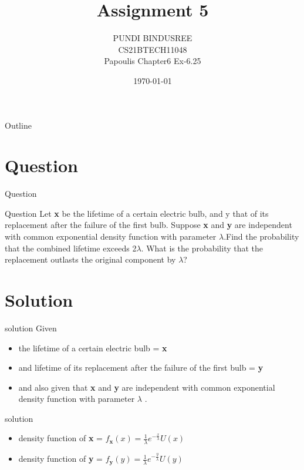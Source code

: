 \documentclass{beamer}
\title{Assignment 5}
\author{PUNDI BINDUSREE \\
     CS21BTECH11048 \\
     Papoulis Chapter6 Ex-6.25\\ }
\date{\today}
\begin{document}
     
\begin{frame}
    \maketitle    
\end{frame}
     
     \logo{}
     
     \begin{frame}{Outline}
    \tableofcontents
     \end{frame}


\section{Question}
\begin{frame}{Question}
\begin{block}{Question}
Let \textbf{x} be the lifetime of a certain electric bulb, and y that of its replacement after the failure of the first bulb. Suppose \textbf{x} and \textbf{y} are independent with common exponential density function with parameter $\lambda$.Find the probability that the combined lifetime exceeds 2$\lambda$. What is the probability that the replacement outlasts the original component by $\lambda$?
\end{block}
\end{frame}


\section{Solution}
\begin{frame}{solution}
Given\\
\begin{itemize}
    \item the lifetime of a certain electric bulb = \textbf{x}
    \item and lifetime of its replacement after the failure of the first bulb = \textbf{y}
    \item and also given that \textbf{x} and \textbf{y} are independent with common exponential density function with parameter $\lambda$ .
\end{itemize}
\end{frame}


\begin{frame}{solution}
\begin{itemize}
    \item density function of \textbf{x} = $f_{\textbf{x}}(x) = \frac{1}{\lambda}e^{-\frac{x}{\lambda}}U(x)$
    \item density function of \textbf{y} = $f_{\textbf{y}}(y) = \frac{1}{\lambda}e^{-\frac{y}{\lambda}}U(y)$
\end{itemize}
\end{frame}
\end{document}
